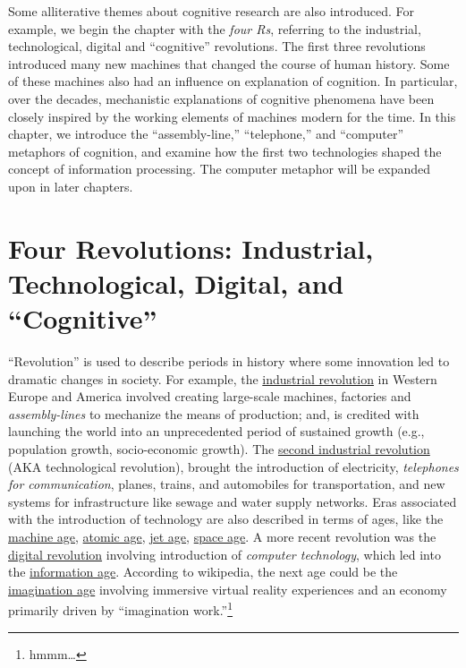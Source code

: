 \documentclass[
  oneside,
  12pt]{crumpbook}
\begin{document}
Some alliterative themes about cognitive research are also introduced. For example, we begin the chapter with the \emph{four Rs}, referring to the industrial, technological, digital and ``cognitive'' revolutions. The first three revolutions introduced many new machines that changed the course of human history. Some of these machines also had an influence on explanation of cognition. In particular, over the decades, mechanistic explanations of cognitive phenomena have been closely inspired by the working elements of machines modern for the time. In this chapter, we introduce the ``assembly-line,'' ``telephone,'' and ``computer'' metaphors of cognition, and examine how the first two technologies shaped the concept of information processing. The computer metaphor will be expanded upon in later chapters.

\hypertarget{four-revolutions-industrial-technological-digital-and-cognitive}{%
\section{Four Revolutions: Industrial, Technological, Digital, and ``Cognitive''}\label{four-revolutions-industrial-technological-digital-and-cognitive}}

``Revolution'' is used to describe periods in history where some innovation led to dramatic changes in society. For example, the \href{https://en.wikipedia.org/wiki/Industrial_Revolution}{industrial revolution} in Western Europe and America involved creating large-scale machines, factories and \emph{assembly-lines} to mechanize the means of production; and, is credited with launching the world into an unprecedented period of sustained growth (e.g., population growth, socio-economic growth). The \href{https://en.wikipedia.org/wiki/Second_Industrial_Revolution}{second industrial revolution} (AKA technological revolution), brought the introduction of electricity, \emph{telephones for communication}, planes, trains, and automobiles for transportation, and new systems for infrastructure like sewage and water supply networks. Eras associated with the introduction of technology are also described in terms of ages, like the \href{https://en.wikipedia.org/wiki/Machine_Age}{machine age}, \href{https://en.wikipedia.org/wiki/Atomic_Age}{atomic age}, \href{https://en.wikipedia.org/wiki/Jet_Age}{jet age}, \href{https://en.wikipedia.org/wiki/Space_Age}{space age}. A more recent revolution was the \href{https://en.wikipedia.org/wiki/Digital_Revolution}{digital revolution} involving introduction of \emph{computer technology}, which led into the \href{https://en.wikipedia.org/wiki/Information_Age}{information age}. According to wikipedia, the next age could be the \href{https://en.wikipedia.org/wiki/Imagination_age}{imagination age} involving immersive virtual reality experiences and an economy primarily driven by ``imagination work.''\footnote{hmmm\ldots{}}
\end{document}

